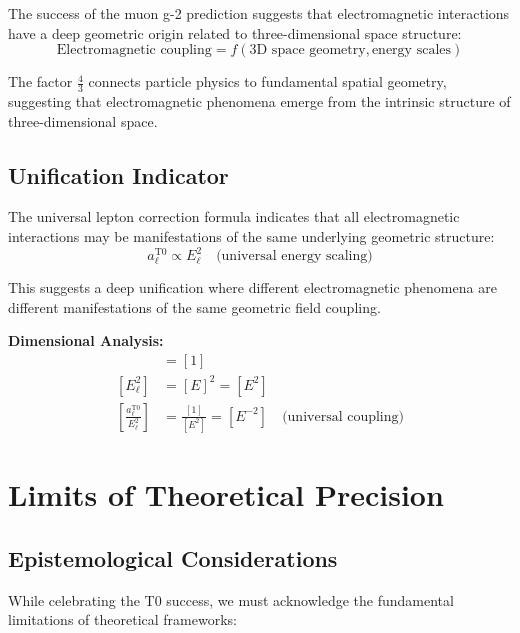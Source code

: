 \documentclass[12pt,a4paper]{report}
\begin{document}
	The success of the muon g-2 prediction suggests that electromagnetic interactions have a deep geometric origin related to three-dimensional space structure:
	\begin{equation}
		\text{Electromagnetic coupling} = f(\text{3D space geometry}, \text{energy scales})
	\end{equation}
	
	The factor $\frac{4}{3}$ connects particle physics to fundamental spatial geometry, suggesting that electromagnetic phenomena emerge from the intrinsic structure of three-dimensional space.
	
	\subsection{Unification Indicator}
	\label{subsec:unification_indicator}
	
	The universal lepton correction formula indicates that all electromagnetic interactions may be manifestations of the same underlying geometric structure:
	\begin{equation}
		a_\ell^{\text{T0}} \propto E_\ell^2 \quad \text{(universal energy scaling)}
	\end{equation}
	
	This suggests a deep unification where different electromagnetic phenomena are different manifestations of the same geometric field coupling.
	
	\textbf{Dimensional Analysis:}
	\begin{align}
		[a_\ell^{\text{T0}}] &= [1] \\
		[E_\ell^2] &= [E]^2 = [E^2] \\
		\left[\frac{a_\ell^{\text{T0}}}{E_\ell^2}\right] &= \frac{[1]}{[E^2]} = [E^{-2}] \quad \text{(universal coupling)}
	\end{align}
	
	\section{Limits of Theoretical Precision}
	\label{sec:limits_precision}
	
	\subsection{Epistemological Considerations}
	\label{subsec:epistemological_considerations}
	
	While celebrating the T0 success, we must acknowledge the fundamental limitations of theoretical frameworks:
	
\end{document}
